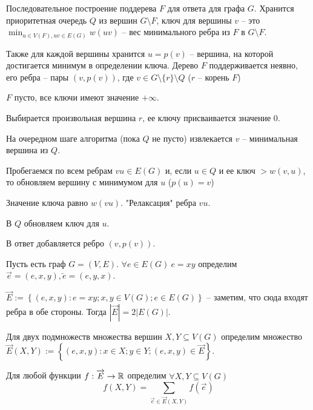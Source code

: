 	\Pagebreak
	\begin{Algo}
		Последовательное построение поддерева $F$ для ответа для графа $G$.
		Хранится приоритетная очередь $Q$ из вершин $G \setminus F$, ключ для вершины $v$ -- это $\displaystyle{\min_{u \in V(F), uv \in E(G)}} w(uv)$ -- вес минимального ребра из $F$ в $G \setminus F$.  

		Также для каждой вершины хранится $u = p(v)$ -- вершина, на которой достигается минимум в определении ключа.
		Дерево $F$ поддерживается неявно, его ребра -- пары $(v, p(v))$, где $v \in G \setminus \{r\} \setminus Q$ ($r$ -- корень $F$) 

		\begin{MyList}
			\item $F$ пусто, все ключи имеют значение $+\infty$.
			\item Выбирается произвольная вершина $r$, ее ключу присваивается значение 0.
			\item На очередном шаге алгоритма (пока $Q$ не пусто) извлекается $v$ -- минимальная вершина из $Q$.
			\begin{MyItemize}
				\item Пробегаемся по всем ребрам $vu \in E(G)$ и, если $u \in Q$ и ее ключ $> w(v, u)$,
				то обновляем вершину с минимумом для $u$ ($p(u) = v$)
				
				\item Значение ключа равно $w(vu)$. "Релаксация" ребра $vu$.
				\item В $Q$ обновляем ключ для $u$.
				\item В ответ добавляется ребро $(v, p(v))$.
			\end{MyItemize}
		\end{MyList}
	\end{Algo}


	Пусть есть граф $G = (V, E)$.
	$\forall e \in E(G) \ e = xy$ определим $\overrightarrow{e} = (e, x, y), \overleftarrow{e} = (e, y, x)$.

	$\overrightarrow{E} := \left\{(e, x, y) : e = xy; x, y \in V(G); e \in E(G)\right\}$ -- заметим, что сюда входят ребра в обе стороны.
	Тогда $\left|\overrightarrow{E}\right| = 2\left|E(G)\right|$.
	
	Для двух подмножеств множества вершин $X, Y \subseteq V(G)$ определим множество $\overrightarrow{E} (X, Y) := \left\{(e, x, y) : x \in X; y \in Y; (e, x, y) \in \overrightarrow{E}\right\}$.
	
	Для любой функции $f : \overrightarrow{E} \to \mathbb{R}$ определим $\forall X, Y \subseteq V(G)$
	\[f(X, Y) = \sum_{\overrightarrow{e} \in \overrightarrow{E} (X, Y)} f \left(\overrightarrow{e}\right)\]
	
